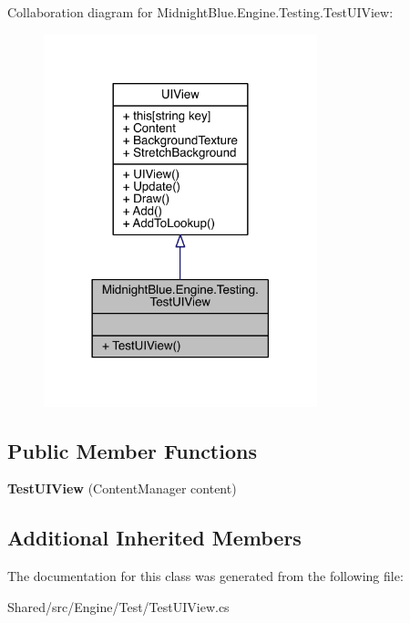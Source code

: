 Collaboration diagram for Midnight\+Blue.\+Engine.\+Testing.\+Test\+U\+I\+View\+:
\nopagebreak
\begin{figure}[H]
\begin{center}
\leavevmode
\includegraphics[width=225pt]{class_midnight_blue_1_1_engine_1_1_testing_1_1_test_u_i_view__coll__graph}
\end{center}
\end{figure}
\subsection*{Public Member Functions}
\begin{DoxyCompactItemize}
\item 
\hypertarget{class_midnight_blue_1_1_engine_1_1_testing_1_1_test_u_i_view_af7087aa5ccf45f391bd89a3bdb43fd20}{}\label{class_midnight_blue_1_1_engine_1_1_testing_1_1_test_u_i_view_af7087aa5ccf45f391bd89a3bdb43fd20} 
{\bfseries Test\+U\+I\+View} (Content\+Manager content)
\end{DoxyCompactItemize}
\subsection*{Additional Inherited Members}


The documentation for this class was generated from the following file\+:\begin{DoxyCompactItemize}
\item 
Shared/src/\+Engine/\+Test/Test\+U\+I\+View.\+cs\end{DoxyCompactItemize}
